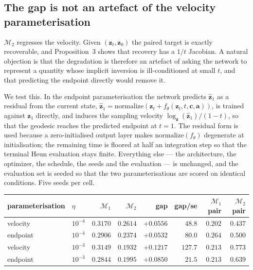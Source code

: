 

\subsection{The gap is not an artefact of the velocity parameterisation}

$\mathcal M_2$ regresses the velocity. Given $(\bm z_t,\bm z_0)$ the paired target is exactly
recoverable, and Proposition~3 shows that recovery has a $1/t$ Jacobian. A natural objection is
that the degradation is therefore an artefact of asking the network to represent a quantity whose
implicit inversion is ill-conditioned at small $t$, and that predicting the endpoint directly
would remove it.

We test this. In the endpoint parameterisation the network predicts $\hat{\bm z}_1$ as a residual
from the current state, $\hat{\bm z}_1=\mathrm{normalize}(\bm z_t+f_\theta(\bm z_t,t,\bm c,\bm a))$,
is trained against $\bm z_1$ directly, and induces the sampling velocity
$\log_{\bm z}(\hat{\bm z}_1)/(1-t)$, so that the geodesic reaches the predicted endpoint at
$t=1$. The residual form is used because a zero-initialised output layer makes
$\mathrm{normalize}(f_\theta)$ degenerate at initialisation; the remaining time is floored at half
an integration step so that the terminal Heun evaluation stays finite. Everything else --- the
architecture, the optimizer, the schedule, the seeds and the evaluation --- is unchanged, and the
evaluation set is seeded so that the two parameterisations are scored on identical conditions.
Five seeds per cell.

\begin{center}
\begin{tabular}{@{}llrrrrrr@{}}
\toprule
parameterisation & $\eta$ & $\mathcal M_1$ & $\mathcal M_2$ & gap & gap/se &
$\mathcal M_1$ pair & $\mathcal M_2$ pair\\
\midrule
velocity & $10^{-4}$ & $0.3170$ & $0.2614$ & $+0.0556$ & $48.8$ & $0.202$ & $0.437$\\
endpoint & $10^{-4}$ & $0.2906$ & $0.2374$ & $+0.0532$ & $80.0$ & $0.264$ & $0.500$\\
\addlinespace
velocity & $10^{-3}$ & $0.3149$ & $0.1932$ & $+0.1217$ & $127.7$ & $0.213$ & $0.773$\\
endpoint & $10^{-3}$ & $0.2844$ & $0.1995$ & $+0.0850$ & $21.5$ & $0.213$ & $0.639$\\
\bottomrule
\end{tabular}
\end{center}

